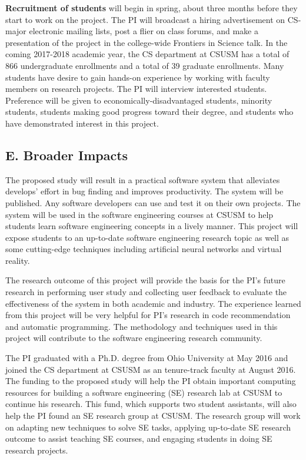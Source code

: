 \textbf{Recruitment of students} will begin in spring, about three months before they start to work on the project. The PI will broadcast a hiring advertisement on CS-major electronic mailing lists, post a flier on class forums, and make a presentation of the project in the college-wide Frontiers in Science talk. In the coming 2017-2018 academic year, the CS department at CSUSM has a total of 866 undergraduate enrollments and a total of 39 graduate enrollments. Many students have desire to gain hands-on experience by working with faculty members on research projects. The PI will interview interested students. Preference will be given to economically-disadvantaged students, minority students, students making good progress toward their degree, and students who have demonstrated interest in this project.

\subsection{E. Broader Impacts}
The proposed study will result in a practical software system that alleviates develops' effort in bug finding and improves productivity. The system will be published. Any software developers can use and test it on their own projects. The system will be used in the software engineering courses at CSUSM to help students learn software engineering concepts in a lively manner. This project will expose students to an up-to-date software engineering research topic as well as some cutting-edge techniques including artificial neural networks and virtual reality.

The research outcome of this project will provide the basis for the PI's future research in performing user study and collecting user feedback to evaluate the effectiveness of the system in both academic and industry. The experience learned from this project will be very helpful for PI's research in code recommendation and automatic programming. The methodology and techniques used in this project will contribute to the software engineering research community.

The PI graduated with a Ph.D. degree from Ohio University at May 2016 and joined the CS department at CSUSM as an tenure-track faculty at August 2016. The funding to the proposed study will help the PI obtain important computing resources for building a software engineering (SE) research lab at CSUSM to continue his research. This fund, which supports two student assistants, will also help the PI found an SE research group at CSUSM. The research group will work on adapting new techniques to solve SE tasks, applying up-to-date SE research outcome to assist teaching SE courses, and engaging students in doing SE research projects.

